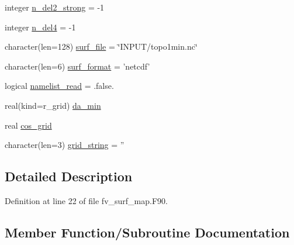 \begin{DoxyCompactItemize}
integer \hyperlink{classfv__surf__map__mod_acaf2dd3583e09efc6410823963d1dcc5}{n\-\_\-del2\-\_\-strong} = -\/1
\item 
integer \hyperlink{classfv__surf__map__mod_ab6c0587435e49a2dfc4980e976ea49a1}{n\-\_\-del4} = -\/1
\item 
character(len=128) \hyperlink{classfv__surf__map__mod_a81edeea9be814dd43921902036f6a5ed}{surf\-\_\-file} = \char`\"{}I\-N\-P\-U\-T/topo1min.\-nc\char`\"{}
\item 
character(len=6) \hyperlink{classfv__surf__map__mod_aa49583bb8f72e949a0f8e60cbae0f533}{surf\-\_\-format} = 'netcdf'
\item 
logical \hyperlink{classfv__surf__map__mod_a297f7387531f5640abd6cd59d925bf83}{namelist\-\_\-read} = .false.
\item 
real(kind=r\-\_\-grid) \hyperlink{classfv__surf__map__mod_a8346ce660fbc9bc7a10f64efe5be71ae}{da\-\_\-min}
\item 
real \hyperlink{classfv__surf__map__mod_a770c3993e55f1b6b79cbe9fbbd5485e1}{cos\-\_\-grid}
\item 
character(len=3) \hyperlink{classfv__surf__map__mod_a1dcad6b1f9095cdd68ab7fbbbae8c609}{grid\-\_\-string} = ''
\end{DoxyCompactItemize}


\subsection{Detailed Description}


Definition at line 22 of file fv\-\_\-surf\-\_\-map.\-F90.



\subsection{Member Function/\-Subroutine Documentation}

